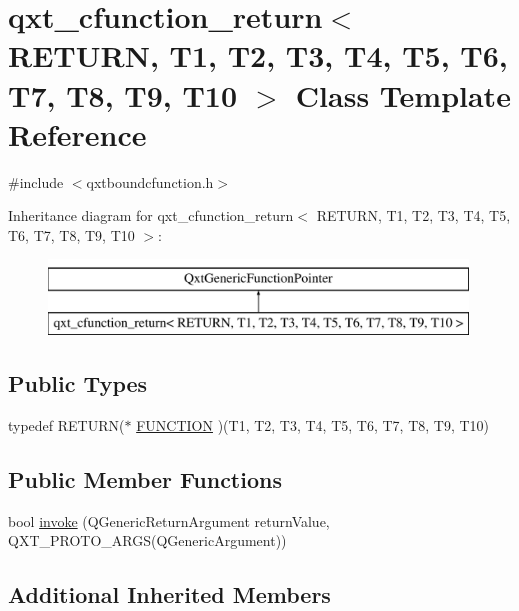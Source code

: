 \hypertarget{classqxt__cfunction__return}{\section{qxt\-\_\-cfunction\-\_\-return$<$ R\-E\-T\-U\-R\-N, T1, T2, T3, T4, T5, T6, T7, T8, T9, T10 $>$ Class Template Reference}
\label{classqxt__cfunction__return}
}


{\ttfamily \#include $<$qxtboundcfunction.\-h$>$}

Inheritance diagram for qxt\-\_\-cfunction\-\_\-return$<$ R\-E\-T\-U\-R\-N, T1, T2, T3, T4, T5, T6, T7, T8, T9, T10 $>$\-:\begin{figure}[H]
\begin{center}
\leavevmode
\includegraphics[height=2.000000cm]{classqxt__cfunction__return}
\end{center}
\end{figure}
\subsection*{Public Types}
\begin{DoxyCompactItemize}
\item 
typedef R\-E\-T\-U\-R\-N($\ast$ \hyperlink{classqxt__cfunction__return_a64d12f4d16cc4a0c6764fccf2c289072}{F\-U\-N\-C\-T\-I\-O\-N} )(T1, T2, T3, T4, T5, T6, T7, T8, T9, T10)
\end{DoxyCompactItemize}
\subsection*{Public Member Functions}
\begin{DoxyCompactItemize}
\item 
bool \hyperlink{classqxt__cfunction__return_a0983f2c09e60fd0630e93242c5cd37f8}{invoke} (Q\-Generic\-Return\-Argument return\-Value, Q\-X\-T\-\_\-\-P\-R\-O\-T\-O\-\_\-A\-R\-G\-S(Q\-Generic\-Argument))
\end{DoxyCompactItemize}
\subsection*{Additional Inherited Members}


